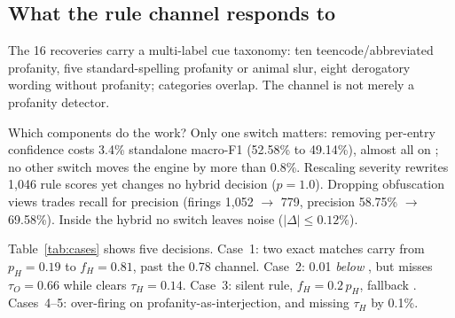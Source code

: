 \subsection{What the rule channel responds to}
\label{sec:cue-taxonomy}

The 16 \hate{} recoveries carry a multi-label cue taxonomy: ten teencode/abbreviated
profanity, five standard-spelling profanity or animal slur, eight derogatory wording
without profanity; categories overlap. The channel is not merely a profanity detector.

Which components do the work? Only
one switch matters: removing per-entry confidence costs 3.4\% standalone macro-F1
(52.58\% to 49.14\%), almost all on \off{}; no other switch moves the engine by more
than 0.8\%. Rescaling severity rewrites 1{,}046 rule scores yet changes no hybrid
decision ($p=1.0$). Dropping obfuscation views trades recall for precision (firings
1{,}052 $\to$ 779, precision 58.75\% $\to$ 69.58\%). Inside the hybrid no switch leaves noise ($|\Delta|\le0.12\%$).

Table~\ref{tab:cases} shows five decisions. Case~1: two exact matches carry \hate{}
from $p_H{=}0.19$ to $f_H{=}0.81$, past the 0.78 \clean{} channel. Case~2: \hate{} 0.01
\emph{below} \off{}, but \off{} misses $\tau_O{=}0.66$ while \hate{} clears $\tau_H{=}0.14$.
Case~3: silent rule, $f_H{=}0.2\,p_H$, fallback \clean{}. Cases~4--5: over-firing on
profanity-as-interjection, and \hate{} missing $\tau_H$ by 0.1\%.


